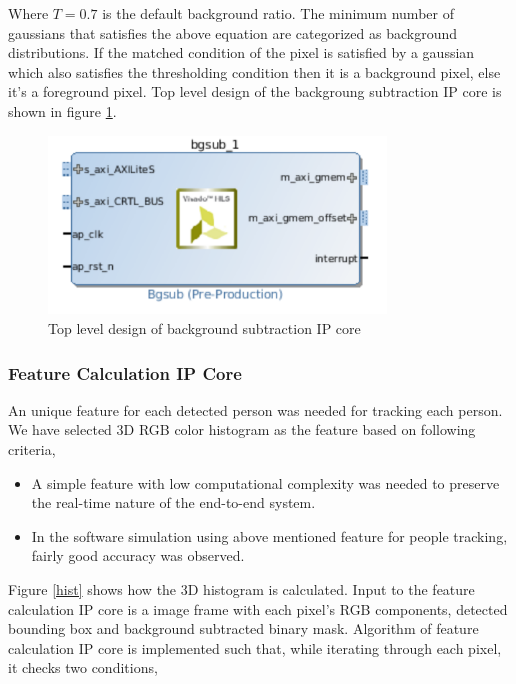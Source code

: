 \documentclass[12pt,a4paper]{report}
\begin{document}
Where $T = 0.7$ is the default background ratio. The minimum number of gaussians that satisfies the above equation are categorized as background distributions. If the matched condition of the pixel is satisfied by a gaussian which also satisfies the thresholding condition then it is a background pixel, else it$’$s a foreground pixel.
Top level design of the backgroung subtraction IP core is shown in figure \ref{gmmip}.

\begin{figure}[H]
\includegraphics[width=0.8\textwidth]{gmmip}
\centering
\caption{Top level design of background subtraction IP core}
\label{gmmip}
\end{figure}

\subsubsection{Feature Calculation IP Core}

An unique feature for each detected person was needed for tracking each person. We have selected 3D RGB color histogram as the feature based on following criteria,
\begin{itemize}
\item A simple feature with low computational complexity was needed to preserve the real-time nature of the end-to-end system.
\item In the software simulation using above mentioned feature for people tracking, fairly good accuracy was observed. 
\end{itemize}

Figure \ref{hist} shows how the 3D histogram is calculated. Input to the feature calculation IP core is a image frame with each pixel’s RGB components, detected bounding box and background subtracted binary mask.
Algorithm of feature calculation IP core is implemented such that, while iterating through each pixel, it checks two conditions,
\end{document}
